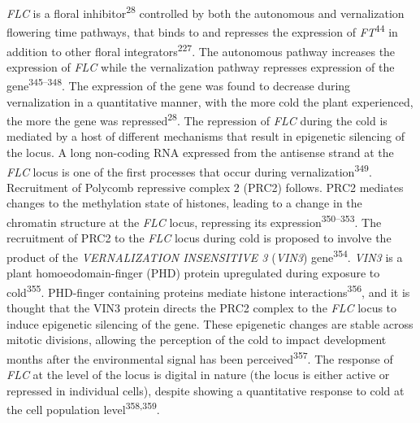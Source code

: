 \documentclass[12pt,]{book}
\begin{document}
\emph{FLC} is a floral inhibitor\textsuperscript{28} controlled by both
the autonomous and vernalization flowering time pathways, that binds to
and represses the expression of \emph{FT}\textsuperscript{44} in
addition to other floral integrators\textsuperscript{227}. The
autonomous pathway increases the expression of \emph{FLC} while the
vernalization pathway represses expression of the
gene\textsuperscript{345--348}. The expression of the gene was found to
decrease during vernalization in a quantitative manner, with the more
cold the plant experienced, the more the gene was
repressed\textsuperscript{28}. The repression of \emph{FLC} during the
cold is mediated by a host of different mechanisms that result in
epigenetic silencing of the locus. A long non-coding RNA expressed from
the antisense strand at the \emph{FLC} locus is one of the first
processes that occur during vernalization\textsuperscript{349}.
Recruitment of Polycomb repressive complex 2 (PRC2) follows. PRC2
mediates changes to the methylation state of histones, leading to a
change in the chromatin structure at the \emph{FLC} locus, repressing
its expression\textsuperscript{350--353}. The recruitment of PRC2 to the
\emph{FLC} locus during cold is proposed to involve the product of the
\emph{VERNALIZATION INSENSITIVE 3} (\emph{VIN3})
gene\textsuperscript{354}. \emph{VIN3} is a plant homoeodomain-finger
(PHD) protein upregulated during exposure to cold\textsuperscript{355}.
PHD-finger containing proteins mediate histone
interactions\textsuperscript{356}, and it is thought that the VIN3
protein directs the PRC2 complex to the \emph{FLC} locus to induce
epigenetic silencing of the gene. These epigenetic changes are stable
across mitotic divisions, allowing the perception of the cold to impact
development months after the environmental signal has been
perceived\textsuperscript{357}. The response of \emph{FLC} at the level
of the locus is digital in nature (the locus is either active or
repressed in individual cells), despite showing a quantitative response
to cold at the cell population level\textsuperscript{358,359}.
\end{document}
